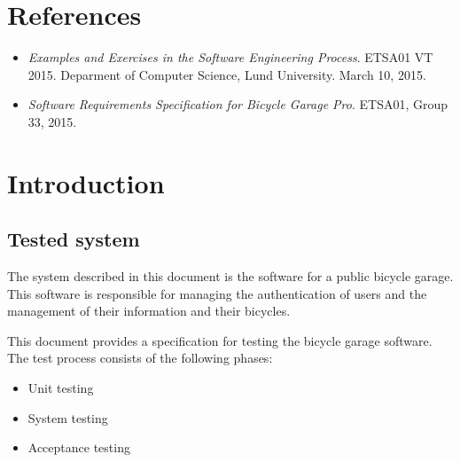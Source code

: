 \documentclass[12pt,titlepage]{article}
\begin{document}


\maketitle
\newpage
\tableofcontents
\thispagestyle{empty}
\setcounter{page}{0}
\newpage


\section{References}
\label{sec:references}

\begin{itemize}
	\item \textit{Examples and Exercises in the Software
		Engineering Process}. ETSA01 VT 2015. Deparment of Computer Science, Lund
		University. March 10, 2015.
	\item \textit{Software Requirements Specification for Bicycle Garage
		Pro}. ETSA01, Group 33, 2015.
\end{itemize}


\section{Introduction}
\label{sec:introduction}

\subsection{Tested system}
\label{subsec:tested-system}

The system described in this document is the software for a public bicycle
garage. This software is responsible for managing the authentication of users
and the management of their information and their bicycles.

This document provides a specification for testing the bicycle garage software.
The test process consists of the following phases:

\begin{itemize}
	\item Unit testing
	\item System testing
	\item Acceptance testing
\end{itemize}
\end{document}
